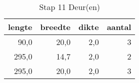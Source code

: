 \begin{table}[h!]
\centering
\caption{Stap 11 Deur(en)}
\begin{tabular}{rrrr}
\toprule
 lengte &  breedte &  dikte &  aantal \\
\midrule
   90,0 &     20,0 &    2,0 &       3 \\
  295,0 &     14,7 &    2,0 &       2 \\
  295,0 &     20,0 &    2,0 &       3 \\
\bottomrule
\end{tabular}
\end{table}
